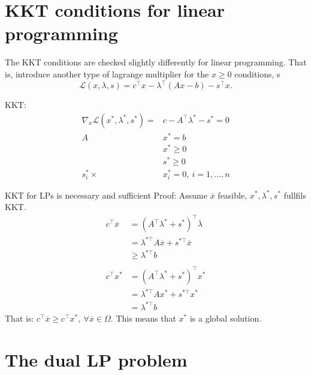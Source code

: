 \documentclass{article}
\begin{document}
\section{KKT conditions for linear programming}

The KKT conditions are checked slightly differently for linear programming. That is, introduce another type
of lagrange multiplier for the $x \geq 0$ conditions, s
\[
  \mathcal{L}(x, \lambda, s) = c^{\top}x - \lambda^{\top}(Ax - b) - s^{\top}x
  .\]

KKT:
\begin{align*}
  \nabla_{x}\mathcal{L}(x^*, \lambda^*, s^*) = & c - A^{\top}\lambda^*-s^* = 0 \\
  A                                            & x^* = b                       \\
                                               & x^* \geq 0                    \\
                                               & s^* \geq 0                    \\
  s_i^* \times                                 & x_i^* = 0,\ i =1,\dots,n
\end{align*}

\begin{proofbox}{KKT for LPs is necessary and sufficient}
  Proof: Assume $\overline{x}$ feasible, $x^*,\lambda^*, s^*$ fullfils KKT.
  \begin{align*}
    c^{\top}\overline{x} & = (A^{\top}\lambda^* + s^*)^{\top}\overline{\lambda}     \\
                         & = \lambda^{*\top}A \overline{x} + s^{*\top} \overline{x} \\
                         & \geq \lambda ^{*\top}b                                   \\ \\
    c^{\top}x^*          & = (A^{\top}\lambda^* + s^*)^{\top}x^*                    \\
                         & = \lambda^{*\top}Ax^*+ s^{*\top}x^* \\
                         &= \lambda^{*\top}b
  \end{align*}
  That is: $c^{\top} \overline{x} \geq c^{\top} x^*,\  \forall \overline{x} \in \Omega$. This means that $x^*$ is a global solution. 
\end{proofbox}

\section{The dual LP problem}
\end{document}
